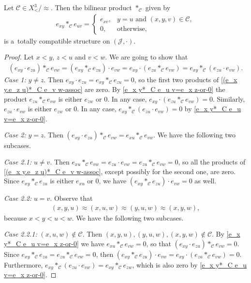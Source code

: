 \documentclass[10pt,a4paper]{amsart}
\newcommand{\C}{\mathcal{C}}
\newcommand{\J}{\mathcal{J}}
\begin{document}
	\begin{lemma}\label{*_C -tot-comp-with-cdot}
		Let $\C\in X^3_< /{\approx}$. Then the bilinear product $*_\C$ given by
		\begin{align}\label{e_x y*_C e_u v=e_x z-or-0}
			e_{xy}*_\C e_{uv}=
			\begin{cases}
				e_{xv}, & y=u\text{ and }(x,y,v)\in\C,\\
				0, & \text{otherwise},
			\end{cases}
		\end{align}
		is a~totally compatible structure on $(\J,\cdot)$.
	\end{lemma}

	\begin{proof}
		Let $x<y$, $z<u$ and $v<w$. We are going to show that
		\begin{align}\label{(e_x y.e_z u)*_C e_v w-assoc}
			(e_{xy}\cdot e_{zu})*_\C e_{vw}=(e_{xy}*_\C e_{zu})\cdot e_{vw}=e_{xy}\cdot (e_{zu}*_\C e_{vw})=e_{xy}*_\C (e_{zu}\cdot e_{vw}).
		\end{align}
		\textit{Case 1:} $y\ne z$. Then $e_{xy}\cdot e_{zu}=e_{xy}*_\C e_{zu}=0$, so the first two products of \eqref{(e_x y.e_z u)*_C e_v w-assoc} are zero. By \eqref{e_x y*_C e_u v=e_x z-or-0} the product $e_{zu}*_\C e_{vw}$ is either $e_{zw}$ or $0$. In any case, $e_{xy}\cdot (e_{zu}*_\C e_{vw})=0$. Similarly, $e_{zu}\cdot e_{vw}$ is either $e_{zw}$ or $0$. In any case, $e_{xy}*_\C (e_{zu}\cdot e_{vw})=0$ by \eqref{e_x y*_C e_u v=e_x z-or-0}.

		\textit{Case 2:} $y=z$. Then $(e_{xy}\cdot e_{zu})*_\C e_{vw}=e_{xu}*_\C e_{vw}$. We have the following two subcases.

		\textit{Case 2.1:} $u\ne v$. Then $e_{xu}*_\C e_{vw}=e_{zu}\cdot e_{vw}=e_{zu}*_\C e_{vw}=0$, so all the products of \eqref{(e_x y.e_z u)*_C e_v w-assoc}, except possibly for the second one, are zero. Since $e_{xy}*_\C e_{zu}$ is either $e_{xu}$ or $0$, we have $(e_{xy}*_\C e_{zu})\cdot e_{vw}=0$ as well.

		\textit{Case 2.2:} $u=v$. Observe that
		\begin{align}\label{(xyu)-(xuw)-(yuw)-(xyw)}
			(x,y,u)\approx(x,u,w)\approx(y,u,w)\approx(x,y,w),
		\end{align}
		because $x<y<u<w$. We have the following two subcases.

		\textit{Case 2.2.1:} $(x,u,w)\not\in\C$. Then $(x,y,u),(y,u,w),(x,y,w)\not\in\C$. By \eqref{e_x y*_C e_u v=e_x z-or-0} we have $e_{xu}*_\C e_{vw}=0$, so that $(e_{xy}\cdot e_{zu})*_\C e_{vw}=0$. Since $e_{xy}*_\C e_{zu}=e_{zu}*_\C e_{vw}=0$, then $(e_{xy}*_\C e_{zu})\cdot e_{vw}=e_{xy}\cdot (e_{zu}*_\C e_{vw})=0$. Furthermore, $e_{xy}*_\C (e_{zu}\cdot e_{vw})=e_{xy}*_\C e_{zw}$, which is also zero by \eqref{e_x y*_C e_u v=e_x z-or-0}.


\end{proof}
\end{document}
